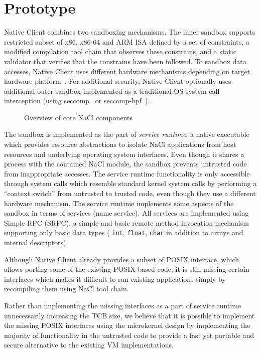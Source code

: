 \section{Prototype}
\label{sec:prototype}

Native Client combines two sandboxing mechanisms. The inner sandbox
supports restricted subset of x86, x86-64 and ARM ISA defined by a set
of constraints, a modified compilation tool chain that observes these
constrains, and a static validator that verifies that the constrains
have been followed. To sandbox data accesses, Native Client uses
different hardware mechanisms depending on target hardware
platform~\cite{yee:ieee-sp09,sehr:usenix-sec10}. For additional
security, Native Client optionally uses additional outer sandbox
implemented as a traditional OS system-call interception (\eg using
seccomp~\cite{seccomp:linux} or
seccomp\mbox{-}bpf~\cite{seccomp-bpf:linux}).

\begin{figure}
\centering
\caption{Overview of core NaCl components}
\label{fig:overview}
\end{figure}

The sandbox is implemented as the part of \emph{service runtime}, a
native executable which provides resource abstractions to isolate NaCl
applications from host resources and underlying operating system
interfaces. Even though it shares a process with the contained NaCl
module, the sandbox prevents untrusted code from inappropriate accesses.
The service runtime functionality is only accessible through system
calls which resemble standard kernel system calls by performing a
``context switch'' from untrusted to trusted code, even though they use
a different hardware mechanism. The service runtime implements some
aspects of the sandbox in terms of services (\eg name service). All
services are implemented using Simple RPC (SRPC), a simple and basic
remote method invocation mechanism supporting only basic data types (\ie
\lstinline`int`, \lstinline`float`, \lstinline`char` in addition to
arrays and internal descriptors).

Although Native Client already provides a subset of POSIX interface,
which allows porting some of the existing POSIX based code, it is still
missing certain interfaces which makes it difficult to run existing
applications simply by recompiling them using NaCl tool chain.

Rather than implementing the missing interfaces as a part of service
runtime unnecessarily increasing the TCB size, we believe that it is
possible to implement the missing POSIX interfaces using the microkernel
design by implementing the majority of functionality in the untrusted
code to provide a fast yet portable and secure alternative to the
existing VM implementations.

